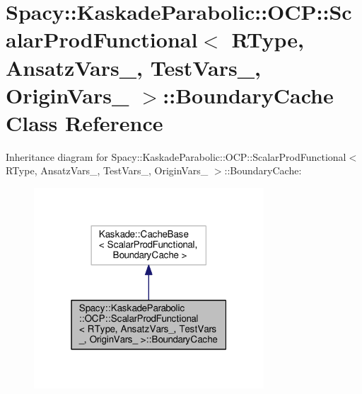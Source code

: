 \hypertarget{classSpacy_1_1KaskadeParabolic_1_1OCP_1_1ScalarProdFunctional_1_1BoundaryCache}{\section{Spacy\-:\-:Kaskade\-Parabolic\-:\-:O\-C\-P\-:\-:Scalar\-Prod\-Functional$<$ R\-Type, Ansatz\-Vars\-\_\-, Test\-Vars\-\_\-, Origin\-Vars\-\_\- $>$\-:\-:Boundary\-Cache Class Reference}
\label{classSpacy_1_1KaskadeParabolic_1_1OCP_1_1ScalarProdFunctional_1_1BoundaryCache}
}


Inheritance diagram for Spacy\-:\-:Kaskade\-Parabolic\-:\-:O\-C\-P\-:\-:Scalar\-Prod\-Functional$<$ R\-Type, Ansatz\-Vars\-\_\-, Test\-Vars\-\_\-, Origin\-Vars\-\_\- $>$\-:\-:Boundary\-Cache\-:
\nopagebreak
\begin{figure}[H]
\begin{center}
\leavevmode
\includegraphics[width=244pt]{classSpacy_1_1KaskadeParabolic_1_1OCP_1_1ScalarProdFunctional_1_1BoundaryCache__inherit__graph}
\end{center}
\end{figure}


